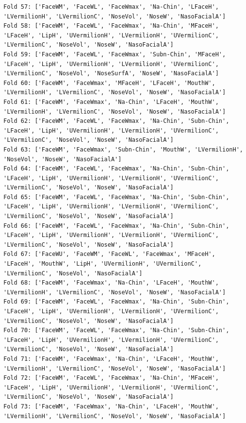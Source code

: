 \documentclass[12pt,a4paper]{article}
\begin{document}
\begin{verbatim}
Fold 57: ['FaceWM', 'FaceWL', 'FaceWmax', 'Na-Chin', 'LFaceH', 'LVermilionH', 'LVermilionC', 'NoseVol', 'NoseW', 'NasoFacialA']
Fold 58: ['FaceWM', 'FaceWL', 'FaceWmax', 'Na-Chin', 'MFaceH', 'LFaceH', 'LipH', 'UVermilionH', 'LVermilionH', 'UVermilionC', 'LVermilionC', 'NoseVol', 'NoseW', 'NasoFacialA']
Fold 59: ['FaceWM', 'FaceWL', 'FaceWmax', 'Subn-Chin', 'MFaceH', 'LFaceH', 'LipH', 'UVermilionH', 'LVermilionH', 'UVermilionC', 'LVermilionC', 'NoseVol', 'NoseSurfA', 'NoseW', 'NasoFacialA']
Fold 60: ['FaceWM', 'FaceWmax', 'MFaceH', 'LFaceH', 'MouthW', 'LVermilionH', 'LVermilionC', 'NoseVol', 'NoseW', 'NasoFacialA']
Fold 61: ['FaceWM', 'FaceWmax', 'Na-Chin', 'LFaceH', 'MouthW', 'LVermilionH', 'LVermilionC', 'NoseVol', 'NoseW', 'NasoFacialA']
Fold 62: ['FaceWM', 'FaceWL', 'FaceWmax', 'Na-Chin', 'Subn-Chin', 'LFaceH', 'LipH', 'UVermilionH', 'LVermilionH', 'UVermilionC', 'LVermilionC', 'NoseVol', 'NoseW', 'NasoFacialA']
Fold 63: ['FaceWM', 'FaceWmax', 'Subn-Chin', 'MouthW', 'LVermilionH', 'NoseVol', 'NoseW', 'NasoFacialA']
Fold 64: ['FaceWM', 'FaceWL', 'FaceWmax', 'Na-Chin', 'Subn-Chin', 'LFaceH', 'LipH', 'UVermilionH', 'LVermilionH', 'UVermilionC', 'LVermilionC', 'NoseVol', 'NoseW', 'NasoFacialA']
Fold 65: ['FaceWM', 'FaceWL', 'FaceWmax', 'Na-Chin', 'Subn-Chin', 'LFaceH', 'LipH', 'UVermilionH', 'LVermilionH', 'UVermilionC', 'LVermilionC', 'NoseVol', 'NoseW', 'NasoFacialA']
Fold 66: ['FaceWM', 'FaceWL', 'FaceWmax', 'Na-Chin', 'Subn-Chin', 'LFaceH', 'LipH', 'UVermilionH', 'LVermilionH', 'UVermilionC', 'LVermilionC', 'NoseVol', 'NoseW', 'NasoFacialA']
Fold 67: ['FaceWU', 'FaceWM', 'FaceWL', 'FaceWmax', 'MFaceH', 'LFaceH', 'MouthW', 'LipH', 'UVermilionH', 'UVermilionC', 'LVermilionC', 'NoseVol', 'NasoFacialA']
Fold 68: ['FaceWM', 'FaceWmax', 'Na-Chin', 'LFaceH', 'MouthW', 'LVermilionH', 'LVermilionC', 'NoseVol', 'NoseW', 'NasoFacialA']
Fold 69: ['FaceWM', 'FaceWL', 'FaceWmax', 'Na-Chin', 'Subn-Chin', 'LFaceH', 'LipH', 'UVermilionH', 'LVermilionH', 'UVermilionC', 'LVermilionC', 'NoseVol', 'NoseW', 'NasoFacialA']
Fold 70: ['FaceWM', 'FaceWL', 'FaceWmax', 'Na-Chin', 'Subn-Chin', 'LFaceH', 'LipH', 'UVermilionH', 'LVermilionH', 'UVermilionC', 'LVermilionC', 'NoseVol', 'NoseW', 'NasoFacialA']
Fold 71: ['FaceWM', 'FaceWmax', 'Na-Chin', 'LFaceH', 'MouthW', 'LVermilionH', 'LVermilionC', 'NoseVol', 'NoseW', 'NasoFacialA']
Fold 72: ['FaceWM', 'FaceWL', 'FaceWmax', 'Na-Chin', 'MFaceH', 'LFaceH', 'LipH', 'UVermilionH', 'LVermilionH', 'UVermilionC', 'LVermilionC', 'NoseVol', 'NoseW', 'NasoFacialA']
Fold 73: ['FaceWM', 'FaceWmax', 'Na-Chin', 'LFaceH', 'MouthW', 'LVermilionH', 'LVermilionC', 'NoseVol', 'NoseW', 'NasoFacialA']

\end{verbatim}
\end{document}
